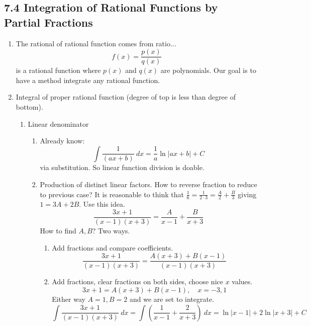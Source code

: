 \documentclass{article}
\begin{document}
\subsection{7.4 Integration of Rational Functions by Partial Fractions}
\begin{enumerate}

\item The rational of rational function comes from ratio...
$$
f(x) = \frac{p(x)}{q(x)}
$$
is a rational function where $p(x)$ and $q(x)$ are polynomials. 
Our goal is to have a method integrate any rational function.

\item Integral of proper rational function (degree of top is less than degree of bottom). 
\begin{enumerate}

\item Linear denominator
\begin{enumerate}

\item Already know: 
$$
\int \frac{1}{(ax+b)}~dx = \frac{1}{a}\ln |ax+b| + C
$$
via substitution. So linear function division is doable.

\item Production of distinct linear factors. How to reverse fraction to reduce to previous case?
It is reasonable to think that $\frac{1}{6} = \frac{1}{2\cdot 3} = \frac{A}{2} + \frac{B}{3}$ giving $1=3A+2B$. Use this idea. 
$$
\frac{3x+1}{(x-1)(x+3)} = \frac{A}{x-1}+\frac{B}{x+3}
$$
How to find $A,B$? Two ways.
\begin{enumerate}
\item Add fractions and compare coefficients.
$$
\frac{3x+1}{(x-1)(x+3)} = \frac{A(x+3)+B(x-1)}{(x-1)(x+3)}
$$
\item Add fractions, clear fractions on both sides, choose nice $x$ values.
$$
3x+1 = A(x+3)+B(x-1), \quad x=-3,1
$$
Either way $A=1, B=2$ and we are set to integrate.
\[
\int \frac{3x+1}{(x-1)(x+3)}~dx = \int\left(\frac{1}{x-1}+\frac{2}{x+3}\right) ~dx = \ln|x-1| + 2\ln|x+3| + C
\]
\end{enumerate}


\end{enumerate}
\end{enumerate}
\end{enumerate}
\end{document}
